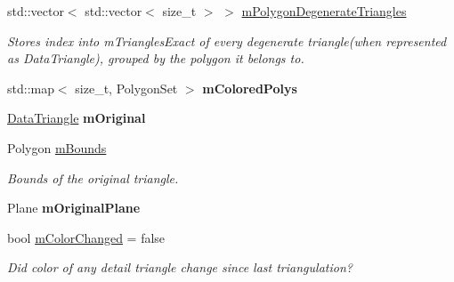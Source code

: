 \begin{DoxyCompactItemize}
\mbox{\label{classpepr3d_1_1_triangle_detail_a706689e78ae910e7bd4a799fc44db740}} 
std\+::vector$<$ std\+::vector$<$ size\+\_\+t $>$ $>$ \mbox{\hyperlink{classpepr3d_1_1_triangle_detail_a706689e78ae910e7bd4a799fc44db740}{m\+Polygon\+Degenerate\+Triangles}}
\begin{DoxyCompactList}\small\item\em Stores index into m\+Triangles\+Exact of every degenerate triangle(when represented as Data\+Triangle), grouped by the polygon it belongs to. \end{DoxyCompactList}\item 
\mbox{\label{classpepr3d_1_1_triangle_detail_a93dde966f3762bad3f47b0932bbcc70a}} 
std\+::map$<$ size\+\_\+t, Polygon\+Set $>$ {\bfseries m\+Colored\+Polys}
\item 
\mbox{\label{classpepr3d_1_1_triangle_detail_a4c6c24850c358f6a553b78b1460338fe}} 
\mbox{\hyperlink{classpepr3d_1_1_data_triangle}{Data\+Triangle}} {\bfseries m\+Original}
\item 
\mbox{\label{classpepr3d_1_1_triangle_detail_a80df9f3e1d10aafc8d6136490f332c5f}} 
Polygon \mbox{\hyperlink{classpepr3d_1_1_triangle_detail_a80df9f3e1d10aafc8d6136490f332c5f}{m\+Bounds}}
\begin{DoxyCompactList}\small\item\em Bounds of the original triangle. \end{DoxyCompactList}\item 
\mbox{\label{classpepr3d_1_1_triangle_detail_a1f21de29cd698369a8a8bf9f357cdcb2}} 
Plane {\bfseries m\+Original\+Plane}
\item 
\mbox{\label{classpepr3d_1_1_triangle_detail_af49e18248a04af06f958001518b73db0}} 
bool \mbox{\hyperlink{classpepr3d_1_1_triangle_detail_af49e18248a04af06f958001518b73db0}{m\+Color\+Changed}} = false
\begin{DoxyCompactList}\small\item\em Did color of any detail triangle change since last triangulation? \end{DoxyCompactList}\end{DoxyCompactItemize}
